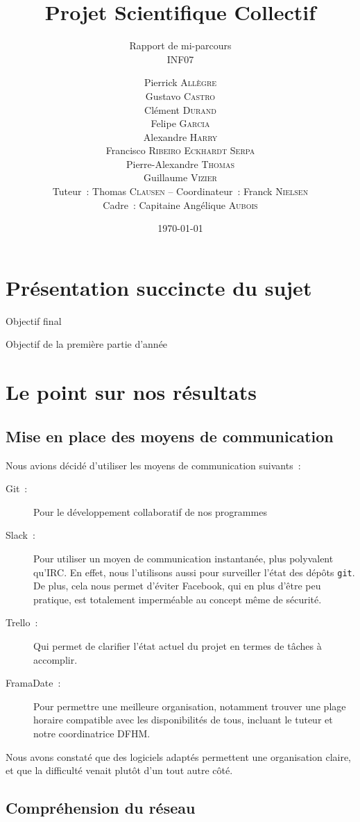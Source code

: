 \documentclass[a4paper, 12pt,twoside]{article}
\title{Projet Scientifique Collectif}
\author{Pierrick \textsc{Allègre} \\
        Gustavo \textsc{Castro} \\
        Clément \textsc{Durand} \\
        Felipe \textsc{Garcia} \\
        Alexandre \textsc{Harry} \\
        Francisco \textsc{Ribeiro Eckhardt Serpa} \\
        Pierre-Alexandre \textsc{Thomas} \\
        Guillaume \textsc{Vizier} \\
        Tuteur~: Thomas \textsc{Clausen} -- Coordinateur~: Franck \textsc{Nielsen} \\
        Cadre~: Capitaine Angélique \textsc{Aubois} \\}
\subtitle{Rapport de mi-parcours \\ INF07}
\date{\today}
\begin{document}
\maketitle
\renewcommand{\baselinestretch}{1.1}
\setlength{\parskip}{0.5em}
\tableofcontents
\clearpage

\section*{Présentation succincte du sujet}
    Objectif final
    
    Objectif de la première partie d'année

\section{Le point sur nos résultats}

    \subsection{Mise en place des moyens de communication}

    Nous avions décidé d'utiliser les moyens de communication suivants~:
    \begin{description}
        \item[Git~:] Pour le développement collaboratif de nos programmes
        \item[Slack~:] Pour utiliser un moyen de communication instantanée, plus polyvalent qu'IRC. En effet, nous l'utilisons aussi pour surveiller l'état des dépôts \verb!git!. De plus, cela nous permet d'éviter Facebook, qui en plus d'être peu pratique, est totalement imperméable au concept même de sécurité.
        \item[Trello~:] Qui permet de clarifier l'état actuel du projet en termes de tâches à accomplir.
        \item[FramaDate~:] Pour permettre une meilleure organisation, notamment trouver une plage horaire compatible avec les disponibilités de tous, incluant le tuteur et notre coordinatrice DFHM.
    \end{description}

    Nous avons constaté que des logiciels adaptés permettent une organisation claire, et que la difficulté venait plutôt d'un tout autre côté.

    \subsection{Compréhension du réseau}
\end{document}
